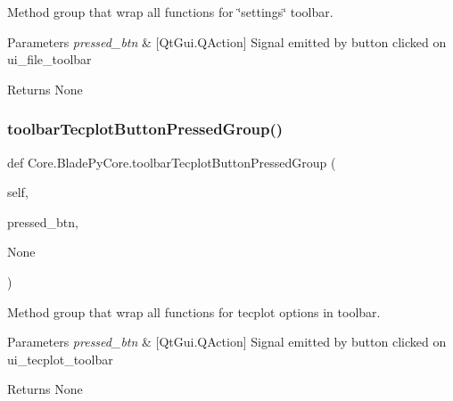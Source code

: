 Method group that wrap all functions for \char`\"{}settings\char`\"{} toolbar. 


\begin{DoxyParams}{Parameters}
{\em pressed\+\_\+btn} & \mbox{[}Qt\+Gui.\+Q\+Action\mbox{]} Signal emitted by button clicked on ui\+\_\+file\+\_\+toolbar \\
\hline
\end{DoxyParams}
\begin{DoxyReturn}{Returns}
None 
\end{DoxyReturn}
\hypertarget{a00081_aabfc46144de45158b8d9c8952cfa1a7d}{}\label{a00081_aabfc46144de45158b8d9c8952cfa1a7d} 
\subsubsection{\texorpdfstring{toolbar\+Tecplot\+Button\+Pressed\+Group()}{toolbarTecplotButtonPressedGroup()}}
{\footnotesize\ttfamily def Core.\+Blade\+Py\+Core.\+toolbar\+Tecplot\+Button\+Pressed\+Group (\begin{DoxyParamCaption}\item[{}]{self,  }\item[{}]{pressed\+\_\+btn,  }\item[{}]{None }\end{DoxyParamCaption})}



Method group that wrap all functions for tecplot options in toolbar. 


\begin{DoxyParams}{Parameters}
{\em pressed\+\_\+btn} & \mbox{[}Qt\+Gui.\+Q\+Action\mbox{]} Signal emitted by button clicked on ui\+\_\+tecplot\+\_\+toolbar \\
\hline
\end{DoxyParams}
\begin{DoxyReturn}{Returns}
None 
\end{DoxyReturn}
\hypertarget{a00081_ade955a1fc8334b12726d9f462ed25c62}{}\label{a00081_ade955a1fc8334b12726d9f462ed25c62} 
